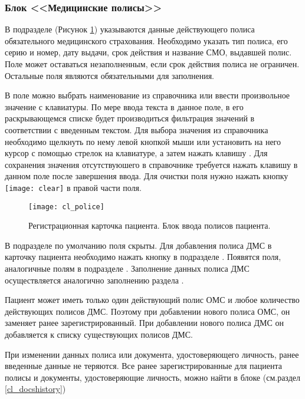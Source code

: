 {\subsubsection{Блок <<Медицинские полисы>>}
  
В подразделе  (Рисунок \ref{img_cl_police}) указываются данные действующего полиса обязательного медицинского страхования. Необходимо указать тип полиса, его серию и номер, дату выдачи, срок действия и название СМО, выдавшей полис. Поле  может оставаться незаполненным, если срок действия полиса не ограничен. Остальные поля являются обязательными для заполнения. 

В поле  можно выбрать наименование из справочника или ввести произвольное значение с клавиатуры. По мере ввода текста в данное поле, в его  раскрывающемся списке будет производиться фильтрация значений в соответствии с введенным текстом. Для выбора значения из справочника необходимо щелкнуть по нему левой кнопкой мыши или установить на него курсор с помощью стрелок на клавиатуре, а затем нажать клавишу . Для сохранения значения отсутствуюшего в справочнике требуется нажать клавишу  в данном поле после завершения ввода. Для очистки поля нужно нажать кнопку \texttt{[image: clear]} в правой части поля.

\begin{figure}[ht]\centering
 \texttt{[image: cl\_police]}
 \caption{Регистрационная карточка пациента. Блок ввода полисов пациента.}
 \label{img_cl_police}
\end{figure}  

В подразделе  по умолчанию поля скрыты. Для добавления полиса ДМС в карточку пациента необходимо нажать кнопку  в подразделе . Появятся поля, аналогичные полям в подразделе . Заполнение данных полиса ДМС осуществляется аналогично заполнению раздела .

Пациент может иметь только один действующий полис ОМС и любое количество действующих полисов ДМС. Поэтому при добавлении нового полиса ОМС, он заменяет ранее зарегистрированный. При добавлении нового полиса ДМС он добавляется к списку существующих полисов ДМС. 

\begin{prim}
При изменении данных полиса или документа, удостоверяющего личность, ранее введенные данные не теряются. Все ранее зарегистрированные для пациента полисы  и документы, удостоверяющие личность, можно найти в блоке  (см.раздел \ref{cl_docshistory})
\end{prim}

}
